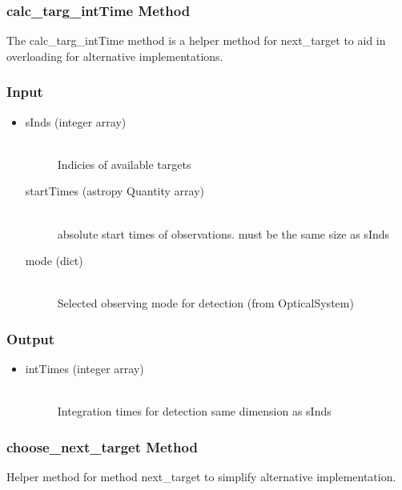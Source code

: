 \documentclass[cleanfoot]{asme2ej}
\begin{document}
\subsubsection{calc\_targ\_intTime Method} \label{sec:calcTargIntTimetask}
The calc\_targ\_intTime method is a helper method for next\_target to aid in overloading for alternative implementations.
\subsubsection*{Input}
\begin{itemize}
\item
\begin{description}
    \item[sInds (integer array)] \hfill \\ Indicies of available targets
    \item[startTimes (astropy Quantity array)] \hfill \\ absolute start times of observations. must be the same size as sInds
    \item[mode (dict)] \hfill \\ Selected observing mode for detection (from OpticalSystem)
\end{description}
\end{itemize}
\subsubsection*{Output}
\begin{itemize}
\item 
\begin{description}
    \item[intTimes (integer array)] \hfill \\ Integration times for detection same dimension as sInds
\end{description}
\end{itemize}

\subsubsection{choose\_next\_target Method} \label{sec:chooseNextTargettask}
Helper method for method next\_target to simplify alternative implementation.
\end{document}
